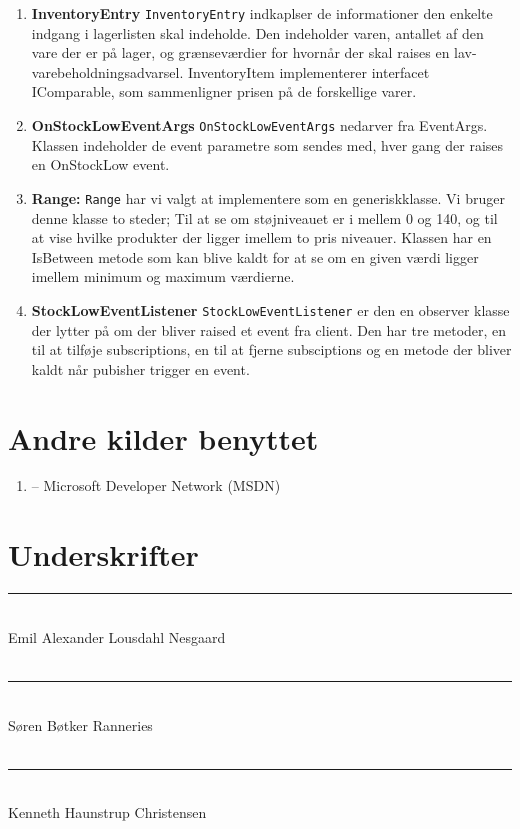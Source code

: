 \documentclass[11pt]{article}
\newcommand{\mono}{\texttt}
\begin{document}
\begin{enumerate}
	\item[] \textbf{InventoryEntry} \mono{InventoryEntry} indkaplser de informationer den enkelte indgang i lagerlisten skal indeholde. Den indeholder varen, antallet af den vare der er på lager, og grænseværdier for hvornår der skal raises en lav-varebeholdningsadvarsel. InventoryItem implementerer interfacet IComparable, som sammenligner prisen på de forskellige varer.
	
	\item[] \textbf{OnStockLowEventArgs} \mono{OnStockLowEventArgs} nedarver fra EventArgs. Klassen indeholder de event parametre som sendes med, hver gang der raises en OnStockLow event.
	
	\item[] \textbf{Range:}
	 \mono{Range} har vi valgt at implementere som en generiskklasse. Vi bruger denne klasse to steder; Til at se om støjniveauet er i mellem 0 og 140, og til at vise hvilke produkter der ligger imellem to pris niveauer. Klassen har en IsBetween metode som kan blive kaldt for at se om en given værdi ligger imellem minimum og maximum værdierne.
	 
	 \item[] \textbf{StockLowEventListener} \mono{StockLowEventListener} er den en observer klasse der lytter på om der bliver raised et event fra client. Den har tre metoder, en til at tilføje subscriptions, en til at fjerne subsciptions og en metode der bliver kaldt når pubisher trigger en event.
	 
\end{enumerate}

\section{Andre kilder benyttet}
\begin{enumerate}
	\item[] -- Microsoft Developer Network (MSDN)
\end{enumerate}

\section{Underskrifter}
\vspace{2cm}
\rule{9cm}{1pt}\\
\vspace{1.5cm}
Emil Alexander Lousdahl Nesgaard\\\\
\rule{9cm}{1pt}\\
\vspace{1.5cm}
Søren Bøtker Ranneries\\\\
\rule{9cm}{1pt}\\
\vspace{1.5cm}
Kenneth Haunstrup Christensen\\\\
\end{document}
